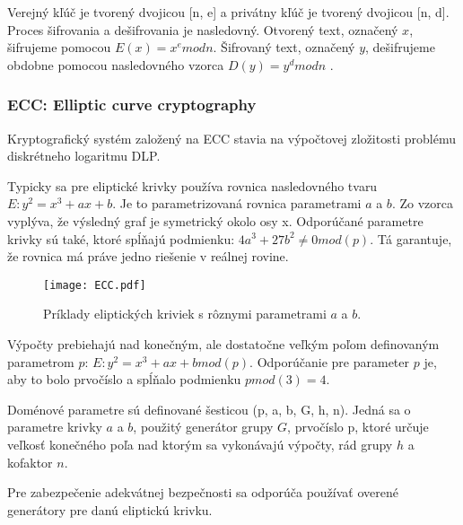 \documentclass[12pt,a4wide,oneside,openright]{report}
\begin{document}
Verejný kľúč je tvorený dvojicou [n, e] a privátny kľúč je tvorený dvojicou [n, d].
Proces šifrovania a dešifrovania je nasledovný. Otvorený text, označený $x$, šifrujeme pomocou $E(x)=x^e mod n$. Šifrovaný text, označený $y$, dešifrujeme obdobne pomocou nasledovného vzorca $D(y)=y^d mod n$ \cite{rsalesson}.


\subsubsection{ECC: Elliptic curve cryptography}
Kryptografický systém založený na ECC stavia na výpočtovej zložitosti problému diskrétneho logaritmu DLP.


Typicky sa pre eliptické krivky používa rovnica nasledovného tvaru $E:y^2=x^3+ax+b$. Je to parametrizovaná rovnica parametrami $a$ a $b$. Zo vzorca vyplýva, že výsledný graf je symetrický okolo osy x.
Odporúčané parametre krivky sú také, ktoré spĺňajú podmienku: $4a^3 + 27b^2\neq0  mod(p)$. Tá garantuje, že rovnica má práve jedno riešenie v reálnej rovine.

\begin{figure}[h]
	\centering
	{\texttt{[image: ECC.pdf]}}
	\caption{Príklady eliptických kriviek s rôznymi parametrami $a$ a $b$.}
	\label{f:o_ECC}
\end{figure}

Výpočty prebiehajú nad konečným, ale dostatočne veľkým poľom definovaným parametrom $p$: $E:y^2=x^3+ax+b mod(p)$.
Odporúčanie pre parameter $p$ je, aby to bolo prvočíslo a spĺňalo podmienku $p mod(3) = 4$.

Doménové parametre sú definované šesticou (p, a, b, G, h, n). Jedná sa o parametre krivky $a$ a $b$, použitý generátor grupy $G$, prvočíslo p, ktoré určuje veľkosť konečného poľa nad ktorým sa vykonávajú výpočty, rád grupy $h$ a kofaktor $n$\cite{ecclesson}.

Pre zabezpečenie adekvátnej bezpečnosti sa odporúča používať overené generátory pre danú eliptickú krivku.
\end{document}

